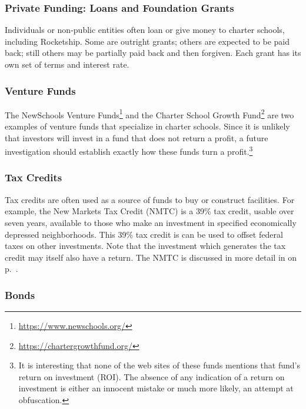 \subsubsection{Private Funding: Loans and Foundation Grants}\label{sec:private-funding}\indent%

Individuals or non-public entities often loan or give money to charter schools, including Rocketship. Some are outright grants; others are expected to be paid back; still others may be partially paid back and then forgiven. Each grant has its own set of terms and interest rate.

\subsubsection{Venture Funds}\label{sec:venture-funds}\indent%

The NewSchools Venture Funds\footnote{\url{https://www.newschools.org/}} and the Charter School Growth Fund\footnote{\url{https://chartergrowthfund.org/}} are two examples of venture funds that specialize in charter schools. Since it is unlikely that investors will invest in a fund that does not return a profit, a future investigation should establish exactly how these funds turn a profit.\footnote{It is interesting that none of the web sites of these funds mentions that fund's return on investment (ROI). The absence of any indication of a return on investment is either an innocent mistake or much more likely, an attempt at obfuscation.}

\subsubsection{Tax Credits}\label{sec:tax-credits}\indent%

Tax credits are often used as a source of funds to buy or construct facilities. For example, the New Markets Tax Credit (NMTC) is a 39\% tax credit, usable over seven years, available to those who make an investment in specified economically depressed neighborhoods. This 39\% tax credit is can be used to offset federal taxes on other investments. Note that the investment which generates the tax credit may itself also have a return. The NMTC is discussed in more detail in  on p.~\pageref{sec:NMTC}.

\subsubsection{Bonds}\label{sec:bond-prospectuses}\indent%

